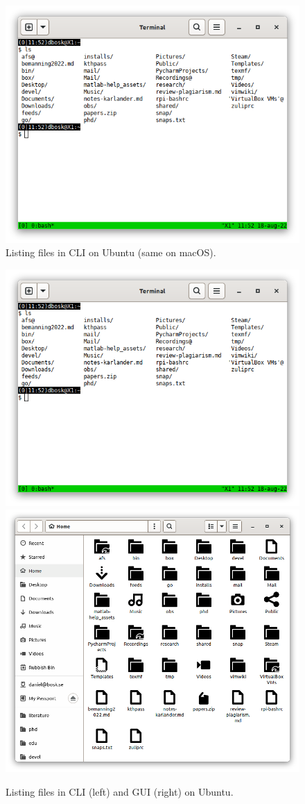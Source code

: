 \begin{frame}
  \begin{figure}
    \includegraphics[height=0.8\textheight]{fig/files-ls.png}
    \caption{Listing files in CLI on Ubuntu (same on macOS).}
  \end{figure}
\end{frame}

\begin{frame}
  \begin{figure}
    \includegraphics[width=0.4\columnwidth]{fig/files-ls.png}
    \hfill
    \includegraphics[width=0.5\columnwidth]{fig/files.png}
    \caption{Listing files in CLI (left) and GUI (right) on Ubuntu.}
  \end{figure}
\end{frame}

